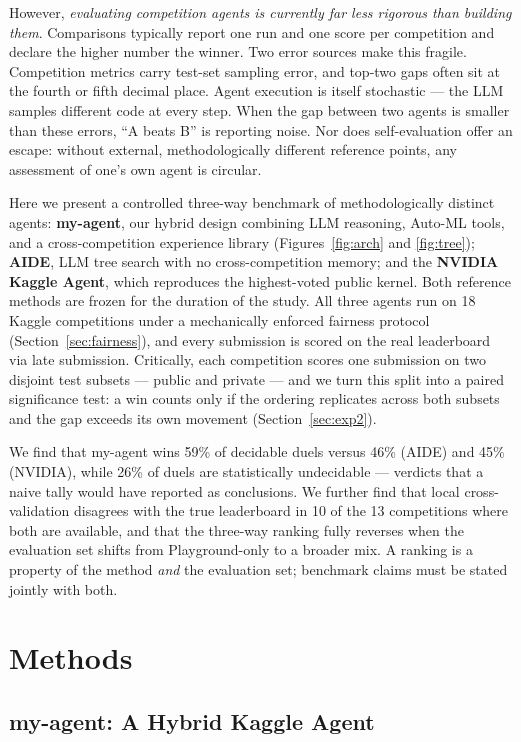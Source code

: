 \documentclass[11pt,a4paper]{article}
\begin{document}
However, \emph{evaluating competition agents is currently far less rigorous than building them}. Comparisons typically report one run and one score per competition and declare the higher number the winner. Two error sources make this fragile. Competition metrics carry test-set sampling error, and top-two gaps often sit at the fourth or fifth decimal place. Agent execution is itself stochastic --- the LLM samples different code at every step. When the gap between two agents is smaller than these errors, ``A beats B'' is reporting noise. Nor does self-evaluation offer an escape: without external, methodologically different reference points, any assessment of one's own agent is circular.

Here we present a controlled three-way benchmark of methodologically distinct agents: \textbf{my-agent}, our hybrid design combining LLM reasoning, Auto-ML tools, and a cross-competition experience library (Figures~\ref{fig:arch} and \ref{fig:tree}); \textbf{AIDE}, LLM tree search with no cross-competition memory; and the \textbf{NVIDIA Kaggle Agent}, which reproduces the highest-voted public kernel. Both reference methods are frozen for the duration of the study. All three agents run on 18 Kaggle competitions under a mechanically enforced fairness protocol (Section~\ref{sec:fairness}), and every submission is scored on the real leaderboard via late submission. Critically, each competition scores one submission on two disjoint test subsets --- public and private --- and we turn this split into a paired significance test: a win counts only if the ordering replicates across both subsets and the gap exceeds its own movement (Section~\ref{sec:exp2}).

We find that my-agent wins 59\% of decidable duels versus 46\% (AIDE) and 45\% (NVIDIA), while 26\% of duels are statistically undecidable --- verdicts that a naive tally would have reported as conclusions. We further find that local cross-validation disagrees with the true leaderboard in 10 of the 13 competitions where both are available, and that the three-way ranking fully reverses when the evaluation set shifts from Playground-only to a broader mix. A ranking is a property of the method \emph{and} the evaluation set; benchmark claims must be stated jointly with both.

\section{Methods}

\subsection{my-agent: A Hybrid Kaggle Agent}
\end{document}
